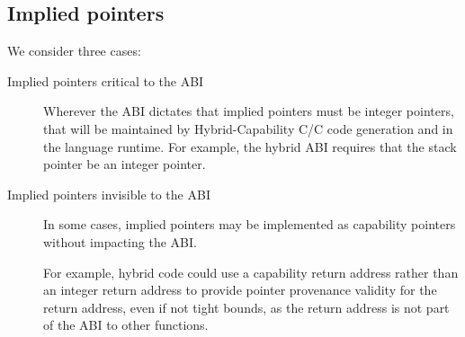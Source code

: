 \documentclass[12pt,twoside,openright,a4paper]{article}
\newcommand{\ccode}[1]{{\small\ttfamily{#1}}}
\newcommand{\cfunc}[1]{{\ccode{#1()}}}
\newcommand{\uucap}{{\ccode{\_\_capability}}\xspace}
\newcommand{\futurevariant}[1]{{\color{teal} #1}}
\newcommand{\note}[2]{{\color{blue}[ Note: #1 - #2]}}
\renewcommand{\note}[2]{\relax\ifhmode\unskip\fi}
\newcommand{\rwnote}[1]{\note{#1}{Robert W.}}
\newcommand{\psnote}[1]{\note{#1}{Peter S.}}
\newcommand{\jrtcnote}[1]{\note{#1}{Jess C.}}
\newcommand{\dcnote}[1]{\note{#1}{David}}
\newcommand*{\cpp}{\texorpdfstring{C\textsmaller[2]{\protect\nolinebreak[4]\hspace{-.05em}\raisebox{.45ex}{\textbf{++}}}}{C++}}
\newcommand*{\COrCpp}{C/\cpp{}}
\newcommand*{\hybridCOrCpp}{Hybrid-Capability \COrCpp{}}
\begin{document}
\rwnote{Do we want a new item, ``Implied pointers that have a limited impact
  on ABI''?  E.g., to capture the CRA case?}

\rwnote{Have we gotten too researchy here, and we should just stick to the
  simple story that only those tagged with \uucap{} matter.
  I seem to recall that we also have a pragma for managing the default
  interpretation to be used in header files shared between interpretations...}

\subsection{Implied pointers}

We consider three cases:

\begin{description}
\item[Implied pointers critical to the ABI]
  Wherever the ABI dictates that implied pointers must be integer pointers,
  that will be maintained by \hybridCOrCpp{} code generation and in the
  language runtime.
  For example, the hybrid ABI requires that the stack pointer be an integer
  pointer.
  \dcnote{This isn't clear to me as a general point.  An ISA that had an
    architectural stack pointer could have a stack capability and define the
    legacy ops that write an integer to the stack pointer to set the address.
    We couldn't do that on MIPS because the stack pointer is non-architectural
    but it would be possible on ARM.}

\item[Implied pointers invisible to the ABI]
  In some cases, implied pointers may be implemented as capability pointers
  without impacting the ABI.

\psnote{again flag more clearly that this is speculative?  The blue colour alone isn't doing it for me}
  
  \futurevariant{For example, hybrid code could use a capability return address
  rather than an integer return address to provide pointer provenance validity
  for the return address, even if not tight bounds, as the return address is
  not part of the ABI to other functions.}

  \jrtcnote{\cfunc{\_\_builtin\_return\_address} does leak these implied
  pointers to some code, and it has implications for things like libunwind, so
  it does affect the ABI. Also the kernel needs to know to put a capability in
  CRA in order for signal handlers to be able to return to \cfunc{sigcode}.
  There's a lot of subtlety here that needs to be captured.}


\end{description}
\end{document}
